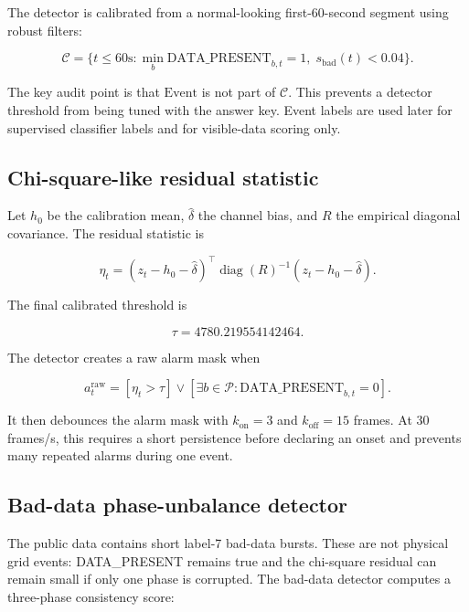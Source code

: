 \documentclass[11pt]{article}
\newcommand{\DataPresent}{\ensuremath{\mathrm{DATA\_PRESENT}}}
\newcommand{\Event}{\ensuremath{\mathrm{Event}}}
\begin{document}
The detector is calibrated from a normal-looking first-60-second segment using
robust filters:

\begin{equation}
  \mathcal{C} =
  \{t \le 60\mathrm{s}: \min_b \DataPresent_{b,t}=1,\;
  s_{\mathrm{bad}}(t)<0.04\}.
\end{equation}

The key audit point is that $\Event$ is not part of $\mathcal{C}$. This prevents
a detector threshold from being tuned with the answer key. Event labels are used
later for supervised classifier labels and for visible-data scoring only.

\subsection{Chi-square-like residual statistic}

Let $h_0$ be the calibration mean, $\hat{\delta}$ the channel bias, and $R$ the
empirical diagonal covariance. The residual statistic is

\begin{equation}
  \eta_t =
  (z_t-h_0-\hat{\delta})^{\top}
  \operatorname{diag}(R)^{-1}
  (z_t-h_0-\hat{\delta}).
  \label{eq:eta}
\end{equation}

The final calibrated threshold is

\begin{equation}
  \tau = 4780.219554142464.
\end{equation}

The detector creates a raw alarm mask when

\begin{equation}
  a_t^{\mathrm{raw}} =
  \left[\eta_t>\tau\right]
  \lor
  \left[\exists b\in\mathcal{P}: \DataPresent_{b,t}=0\right].
\end{equation}

It then debounces the alarm mask with $k_{\mathrm{on}}=3$ and
$k_{\mathrm{off}}=15$ frames. At 30 frames/s, this requires a short persistence
before declaring an onset and prevents many repeated alarms during one event.

\subsection{Bad-data phase-unbalance detector}

The public data contains short label-7 bad-data bursts. These are not physical
grid events: DATA\_PRESENT remains true and the chi-square residual can remain
small if only one phase is corrupted. The bad-data detector computes a
three-phase consistency score:
\end{document}
